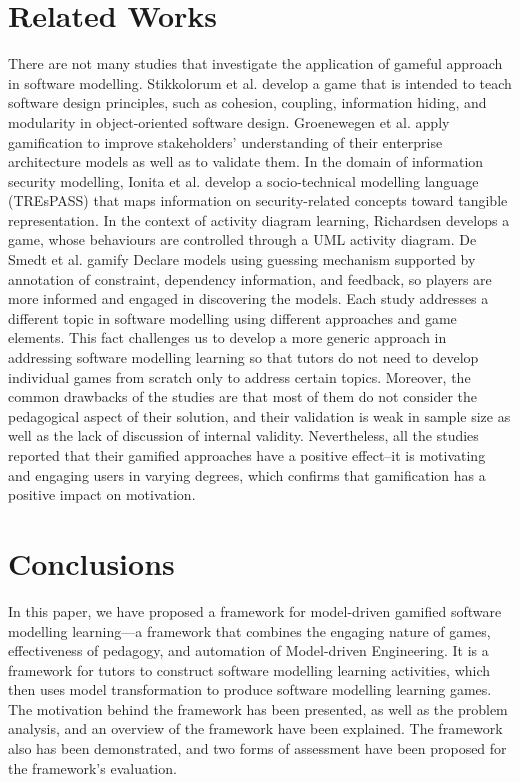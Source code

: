 \documentclass[conference]{IEEEtran}
\begin{document}
\section{Related Works}
\label{Related Works}
There are not many studies that investigate the application of gameful approach in software modelling. Stikkolorum et al. \cite{Stikkolorum2014} develop a game that is intended to teach software design principles, such as cohesion, coupling, information hiding, and modularity in object-oriented software design. Groenewegen et al. \cite{Groenewegen2010} apply gamification to improve stakeholders' understanding of their enterprise architecture models as well as to validate them. In the domain of information security modelling, Ionita et al.\cite{Ionita2015} develop a socio-technical modelling language (TREsPASS) that maps information on security-related concepts toward tangible representation. In the context of activity diagram learning, Richardsen \cite{Richardsen2014} develops a game, whose behaviours are controlled through a UML activity diagram. De Smedt et al. \cite{de2015gamification} gamify Declare models using guessing mechanism supported by annotation of constraint, dependency information, and feedback, so players are more informed and engaged in discovering the models. Each study addresses a different topic in software modelling using different approaches and game elements. This fact challenges us to develop a more generic approach in addressing software modelling learning so that tutors do not need to develop individual games from scratch only to address certain topics. Moreover, the common drawbacks of the studies are that most of them do not consider the pedagogical aspect of their solution, and their validation is weak in sample size as well as the lack of discussion of internal validity. Nevertheless, all the studies reported that their gamified approaches have a positive effect--it is motivating and engaging users in varying degrees, which confirms that gamification has a positive impact on motivation.

\section{Conclusions}
\label{Conclusions}
In this paper, we have proposed a framework for model-driven gamified software modelling learning---a framework that combines the engaging nature of games, effectiveness of pedagogy, and automation of Model-driven Engineering. It is a framework for tutors to construct software modelling learning activities, which then uses model transformation to produce software modelling learning games. The motivation behind the framework has been presented, as well as the problem analysis, and an overview of the framework have been explained. The framework also has been demonstrated, and two forms of assessment have been proposed for the framework's evaluation.
\end{document}

